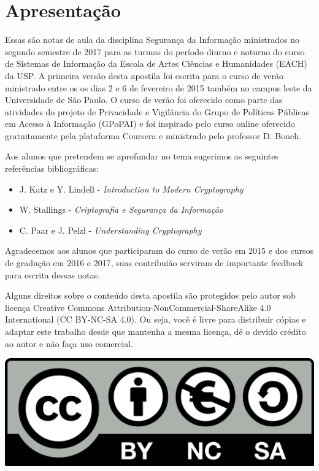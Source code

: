 \chapter*{Apresentação}

Essas são notas de aula da disciplina Segurança da Informação ministrados no segundo semestre de 2017 para as turmas do período diurno e noturno do curso de Sistemas de Informação da Escola de Artes Ciências e Humanidades (EACH) da USP.
A primeira versão desta apostila foi escrita para o curso de verão ministrado entre os os dias 2 e 6 de fevereiro de 2015 também no campus leste da Universidade de São Paulo. 
O curso de verão foi oferecido como parte das atividades do projeto de Privacidade e Vigilância do Grupo de Políticas Públicas em Acesso à Informação (GPoPAI) e foi inspirado pelo curso online oferecido gratuitamente pela plataforma Coursera e ministrado pelo professor D. Boneh.

Aos alunos que pretendem se aprofundar no tema sugerimos as seguintes referências bibliográficas:

\begin{itemize}
\item J. Katz e Y. Lindell - {\em Introduction to Modern Cryptography}
\item W. Stallings - {\em Criptografia e Segurança da Informação}
\item C. Paar e J. Pelzl - {\em Understanding Cryptography}
\end{itemize}

Agradecemos aos alunos que participaram do curso de verão em 2015 e dos cursos de gradução em 2016 e 2017, suas contribuião serviram de importante feedback para escrita dessas notas.

Alguns direitos sobre o conteúdo desta apostila são protegidos pelo autor sob licença Creative Commons
Attribution-NonCommercial-ShareAlike 4.0 International (CC BY-NC-SA 4.0). Ou seja, você  é livre para distribuir cópias e adaptar este trabalho desde que mantenha a mesma licença, dê o devido crédito ao autor e não faça uso comercial.

\begin{center}
  \includegraphics[width=.3\textwidth]{imagens/cc.png}
\end{center}